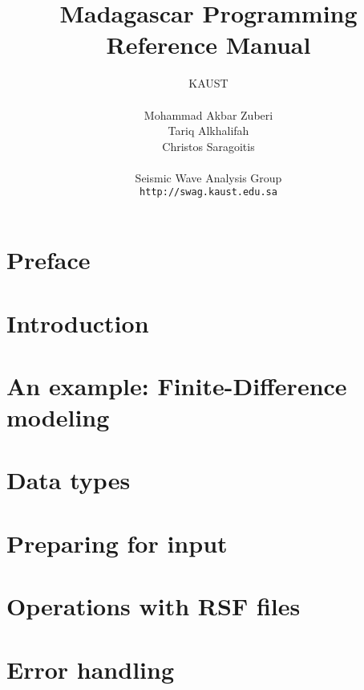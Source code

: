 \documentclass[10pt]{book}
\title{Madagascar Programming Reference Manual}
\author{KAUST\\
               \\
               Mohammad Akbar Zuberi\\
               Tariq Alkhalifah\\
               Christos Saragoitis\\
               \\
               Seismic Wave Analysis Group\\
               \texttt{http://swag.kaust.edu.sa}\\}
\date{}                                           %
\begin{document}
\maketitle
\cleardoublepage

\tableofcontents{}
\cleardoublepage

\chapter*{Preface}


\chapter{Introduction}


\chapter{An example: Finite-Difference modeling}



\chapter{Data types}\label{sec:datatypes}
  

\chapter{Preparing for input}\label{sec:input}
   
\chapter{Operations with RSF files}\label{sec:files}

\chapter{Error handling}\label{sec:error}
\end{document}
